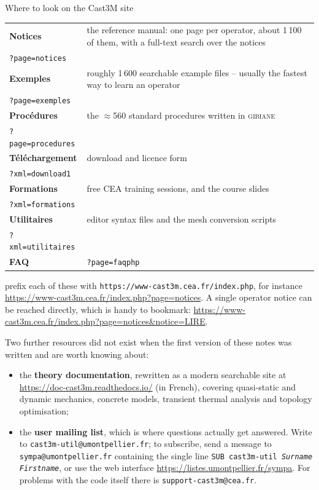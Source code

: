 \begin{gbox}{Where to look on the Cast3M site}
\begin{tabular}{@{}l@{\hspace{4mm}}p{112mm}@{}}
\textbf{Notices} & the reference manual: one page per operator, about 1\,100 of
them, with a full-text search over the notices \\[1.mm]
\texttt{?page=notices} & \\[2.mm]
\textbf{Exemples} & roughly 1\,600 searchable example files -- usually the
fastest way to learn an operator \\[1.mm]
\texttt{?page=exemples} & \\[2.mm]
\textbf{Procédures} & the $\approx$560 standard procedures written in
\textsc{gibiane} \\[1.mm]
\texttt{?page=procedures} & \\[2.mm]
\textbf{Téléchargement} & download and licence form \\[1.mm]
\texttt{?xml=download1} & \\[2.mm]
\textbf{Formations} & free CEA training sessions, and the course slides \\[1.mm]
\texttt{?xml=formations} & \\[2.mm]
\textbf{Utilitaires} & editor syntax files and the mesh conversion scripts \\[1.mm]
\texttt{?xml=utilitaires} & \\[2.mm]
\textbf{FAQ} & \texttt{?page=faqphp} \\
\end{tabular}
\end{gbox}

\noindent prefix each of these with
\texttt{https://www-cast3m.cea.fr/index.php}, for instance
\url{https://www-cast3m.cea.fr/index.php?page=notices}. A single operator
notice can be reached directly, which is handy to bookmark:
\url{https://www-cast3m.cea.fr/index.php?page=notices&notice=LIRE}.

Two further resources did not exist when the first version of these notes was
written and are worth knowing about:

\begin{itemize}
\item the \textbf{theory documentation}, rewritten as a modern searchable site
  at \url{https://doc-cast3m.readthedocs.io/} (in French), covering
  quasi-static and dynamic mechanics, concrete models, transient thermal
  analysis and topology optimisation;
\item the \textbf{user mailing list}, which is where questions actually get
  answered. Write to
  \texttt{cast3m-util@\allowbreak umontpellier.fr}; to subscribe, send
  a message to \texttt{sympa@\allowbreak umontpellier.fr} containing the single line
  \texttt{SUB cast3m-util \textit{Surname} \textit{Firstname}}, or use the web
  interface \url{https://listes.umontpellier.fr/sympa}. For problems with the
  code itself there is \texttt{support-cast3m@cea.fr}.
\end{itemize}

